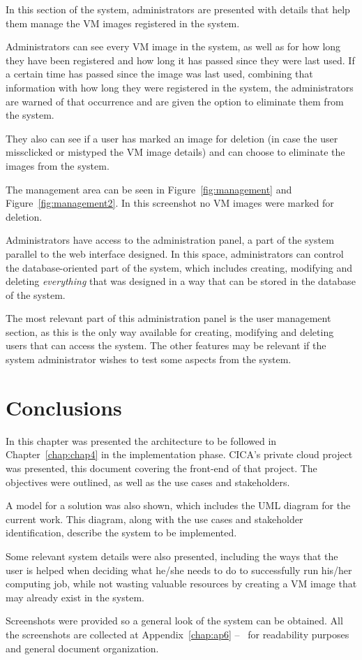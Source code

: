In this section of the system, administrators are presented with details that help them manage the VM images registered in the system.

Administrators can see every VM image in the system, as well as for how long they have been registered and how long it has passed since they were last used. If a certain time has passed since the image was last used, combining that information with how long they were registered in the system, the administrators are warned of that occurrence and are given the option to eliminate them from the system.

They also can see if a user has marked an image for deletion (in case the user missclicked or mistyped the VM image details) and can choose to eliminate the images from the system.

The management area can be seen in Figure~\ref{fig:management} and Figure~\ref{fig:management2}. In this screenshot no VM images were marked for deletion.

Administrators have access to the administration panel, a part of the system parallel to the web interface designed. In this space, administrators can control the database-oriented part of the system, which includes creating, modifying and deleting \emph{everything} that was designed in a way that can be stored in the database of the system.

The most relevant part of this administration panel is the user management section, as this is the only way available for creating, modifying and deleting users that can access the system. The other features may be relevant if the system administrator wishes to test some aspects from the system.

\section{Conclusions}

In this chapter was presented the architecture to be followed in Chapter~\ref{chap:chap4} in the implementation phase. CICA's private cloud project was presented, this document covering the front-end of that project. The objectives were outlined, as well as the use cases and stakeholders.

A model for a solution was also shown, which includes the UML diagram for the current work. This diagram, along with the use cases and stakeholder identification, describe the system to be implemented. 

Some relevant system details were also presented, including the ways that the user is helped when deciding what he/she needs to do to successfully run his/her computing job, while not wasting valuable resources by creating a VM image that may already exist in the system.

Screenshots were provided so a general look of the system can be obtained. All the screenshots are collected at Appendix~\ref{chap:ap6} --~ for readability purposes and general document organization.
